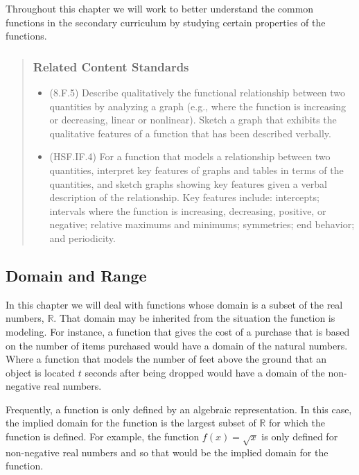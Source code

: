 \documentclass[
]{book}
\providecommand{\tightlist}{%
  \setlength{\itemsep}{0pt}\setlength{\parskip}{0pt}}
\theoremstyle{definition}
\theoremstyle{definition}
\theoremstyle{definition}
\theoremstyle{remark}
\begin{document}
Throughout this chapter we will work to better understand the common functions in the secondary curriculum by studying certain properties of the functions.

\begin{quote}
\hypertarget{related-content-standards-38}{%
\subsubsection*{Related Content Standards}\label{related-content-standards-38}}

\begin{itemize}
\tightlist
\item
  (8.F.5) Describe qualitatively the functional relationship between two quantities by analyzing a graph (e.g., where the function is increasing or decreasing, linear or nonlinear). Sketch a graph that exhibits the qualitative features of a function that has been described verbally.
\item
  (HSF.IF.4) For a function that models a relationship between two quantities, interpret key features of graphs and tables in terms of the quantities, and sketch graphs showing key features given a verbal description of the relationship. Key features include: intercepts; intervals where the function is increasing, decreasing, positive, or negative; relative maximums and minimums; symmetries; end behavior; and periodicity.
\end{itemize}
\end{quote}

\hypertarget{domain-and-range}{%
\subsection{Domain and Range}\label{domain-and-range}}

In this chapter we will deal with functions whose domain is a subset of the real numbers, \(\mathbb{R}\). That domain may be inherited from the situation the function is modeling. For instance, a function that gives the cost of a purchase that is based on the number of items purchased would have a domain of the natural numbers. Where a function that models the number of feet above the ground that an object is located \(t\) seconds after being dropped would have a domain of the non-negative real numbers.

Frequently, a function is only defined by an algebraic representation. In this case, the implied domain for the function is the largest subset of \(\mathbb{R}\) for which the function is defined. For example, the function \(f(x)=\sqrt{x}\) is only defined for non-negative real numbers and so that would be the implied domain for the function.
\end{document}
